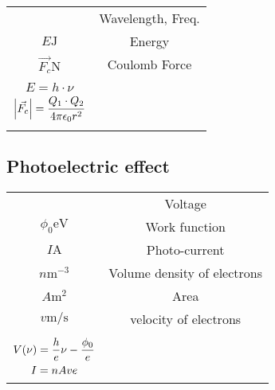 \documentclass{article}
\begin{document}
\begin{twocolumn}
\begin{donotbrake}
\begin{tabular}{cc}
	\begin{dtabular}
		$\lambda \si{\meter}, \, \nu\si{\per\second}$ & Wavelength, Freq. \\
		$E \si{\joule}$ & Energy \\
		$\vec{F_c} \si{\newton}$ & Coulomb Force \\
	\end{dtabular} &
	\begin{mtabular}{c}
		$\fmm \lambda = \frac{c}{\nu} \quad \fmm \nu = \frac{c}{\lambda} \quad \omega = 2 \pi \nu$ \\
		$E = h \cdot \nu$ \\
		$\displaystyle \left| \vec{F_c} \right| = \frac{Q_1 \cdot Q_2}{4 \pi \epsilon_0 r^2}$ \\
	\end{mtabular}
\end{tabular}

\end{donotbrake}


\begin{donotbrake}
\subsection{Photoelectric effect}

\begin{tabular}{cc}
	\begin{dtabular}
		$V \si{\volt}$ & Voltage \\
		$\phi_0 \si{\electronvolt} $ & Work function \\
		$I \si{\ampere}$ & Photo-current \\
		$n \si{\metre^{-3}}$ & Volume density of electrons \\
		$A \si{\metre \squared}$ & Area \\
		$v \si{\metre \per \second}$ & velocity of electrons \\	
	\end{dtabular} &
	\begin{mtabular}{c}
		$\fmm h \nu - \phi_0 = \frac{1}{2} m v^2 = eV$ \\
		$\displaystyle V(\nu) =  \frac{h}{e} \nu - \frac{\phi_0}{e}$ \\
		$\displaystyle I = n A v e$ \\
	\end{mtabular}
\end{tabular}
\end{donotbrake}


\begin{donotbrake}

\end{donotbrake}
\end{twocolumn}
\end{document}
